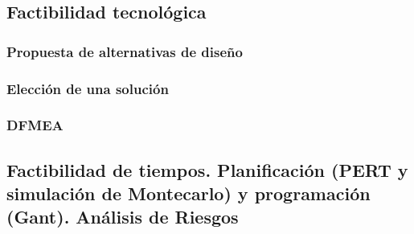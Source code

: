 

\subsection{Factibilidad tecnológica}  

  \newpage



  \subsubsection{Propuesta de alternativas de diseño}  

  \newpage



  \subsubsection{Elección de una solución}  

  \newpage



  \subsubsection{DFMEA}  

  \newpage


  \subsection{Factibilidad de tiempos. Planificación (PERT y simulación de Montecarlo) y programación (Gant). Análisis de Riesgos}  

